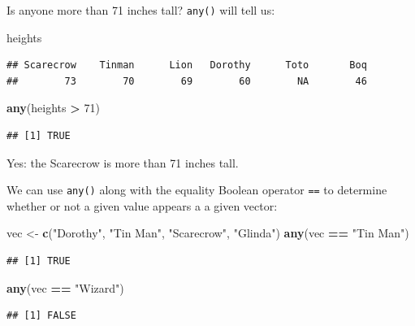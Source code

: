 \documentclass[]{book}
\makeatletter
\newenvironment{Shaded}{\begin{snugshade}}{\end{snugshade}}
\newcommand{\KeywordTok}[1]{\textcolor[rgb]{0.13,0.29,0.53}{\textbf{#1}}}
\newcommand{\DecValTok}[1]{\textcolor[rgb]{0.00,0.00,0.81}{#1}}
\newcommand{\StringTok}[1]{\textcolor[rgb]{0.31,0.60,0.02}{#1}}
\newcommand{\OperatorTok}[1]{\textcolor[rgb]{0.81,0.36,0.00}{\textbf{#1}}}
\newcommand{\NormalTok}[1]{#1}
\newenvironment{kframe}{%
\medskip{}
\setlength{\fboxsep}{.8em}
 \def\at@end@of@kframe{}%
 \ifinner\ifhmode%
  \def\at@end@of@kframe{\end{minipage}}%
  \begin{minipage}{\columnwidth}%
 \fi\fi%
 \def\FrameCommand##1{\hskip\@totalleftmargin \hskip-\fboxsep
 \colorbox{shadecolor}{##1}\hskip-\fboxsep
     \hskip-\linewidth \hskip-\@totalleftmargin \hskip\columnwidth}%
 \MakeFramed {\advance\hsize-\width
   \@totalleftmargin\z@ \linewidth\hsize
   \@setminipage}}%
 {\par\unskip\endMakeFramed%
 \at@end@of@kframe}
\renewenvironment{Shaded}{\begin{kframe}}{\end{kframe}}
\theoremstyle{definition}
\theoremstyle{definition}
\theoremstyle{definition}
\theoremstyle{remark}
\makeatother
\begin{document}
Is anyone more than 71 inches tall?
\texttt{any()} will tell us:

\begin{Shaded}
\begin{Highlighting}[]
\NormalTok{heights}
\end{Highlighting}
\end{Shaded}

\begin{verbatim}
## Scarecrow    Tinman      Lion   Dorothy      Toto       Boq 
##        73        70        69        60        NA        46
\end{verbatim}

\begin{Shaded}
\begin{Highlighting}[]
\KeywordTok{any}\NormalTok{(heights }\OperatorTok{>}\StringTok{ }\DecValTok{71}\NormalTok{)}
\end{Highlighting}
\end{Shaded}

\begin{verbatim}
## [1] TRUE
\end{verbatim}

Yes: the Scarecrow is more than 71 inches tall.

We can use \texttt{any()} along with the equality Boolean operator
\texttt{==} to determine whether or not a given value appears a a given
vector:

\begin{Shaded}
\begin{Highlighting}[]
\NormalTok{vec <-}\StringTok{ }\KeywordTok{c}\NormalTok{(}\StringTok{"Dorothy"}\NormalTok{, }\StringTok{"Tin Man"}\NormalTok{, }\StringTok{"Scarecrow"}\NormalTok{, }\StringTok{"Glinda"}\NormalTok{)}
\KeywordTok{any}\NormalTok{(vec }\OperatorTok{==}\StringTok{ "Tin Man"}\NormalTok{)}
\end{Highlighting}
\end{Shaded}

\begin{verbatim}
## [1] TRUE
\end{verbatim}

\begin{Shaded}
\begin{Highlighting}[]
\KeywordTok{any}\NormalTok{(vec }\OperatorTok{==}\StringTok{ "Wizard"}\NormalTok{)}
\end{Highlighting}
\end{Shaded}

\begin{verbatim}
## [1] FALSE
\end{verbatim}
\end{document}
